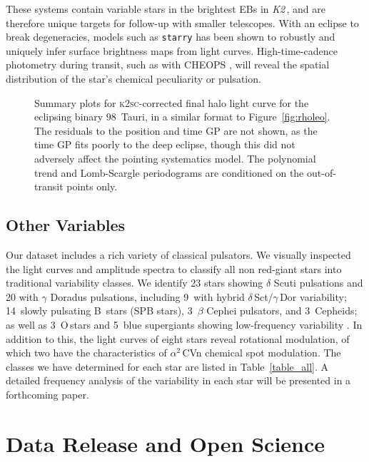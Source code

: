 \documentclass[modern]{aastex62}
\newcommand\ktwo{\emph{K2}\,}
\begin{document}
These systems contain variable stars in the brightest EBs in \ktwo, and are therefore unique targets for follow-up with smaller telescopes. With an eclipse to break degeneracies, models such as \texttt{starry} \citep{starry} has been shown to robustly and uniquely infer surface brightness maps from light curves. High-time-cadence photometry during transit, such as with CHEOPS \citep{cheops}, will reveal the spatial distribution of the star's chemical peculiarity or pulsation. 

\begin{figure*}
\caption{Summary plots for \textsc{k2sc}-corrected final halo light curve for the eclipsing binary 98~Tauri, in a similar format to Figure~\ref{fig:rholeo}. The residuals to the position and time GP are not shown, as the time GP fits poorly to the deep eclipse, though this did not adversely affect the pointing systematics model. The polynomial trend and Lomb-Scargle periodograms are conditioned on the out-of-transit points only.}
\label{fig:98tau}
\end{figure*}


\subsection{Other Variables}
\label{sec:variables}

Our dataset includes a rich variety of classical pulsators. We visually inspected the light curves and amplitude spectra to classify all non red-giant stars into traditional variability classes. We identify 23 stars showing $\delta$ Scuti pulsations and 20 with $\gamma$ Doradus pulsations, including 9~with hybrid $\delta$\,Sct/$\gamma$\,Dor variability; 14~slowly pulsating B~stars (SPB stars), 3~$\beta$ Cephei pulsators, and 3~Cepheids; as well as 3~O\,stars and 5~blue supergiants showing low-frequency variability \citep[as in][]{Aerts2018,bowman19}. In addition to this, the light curves of eight stars reveal rotational modulation, of which two have the characteristics of $\alpha^2$\,CVn chemical spot modulation. The classes we have determined for each star are listed in Table~\ref{table_all}. A detailed frequency analysis of the variability in each star will be presented in a forthcoming paper.


\section{Data Release and Open Science}
\end{document}
